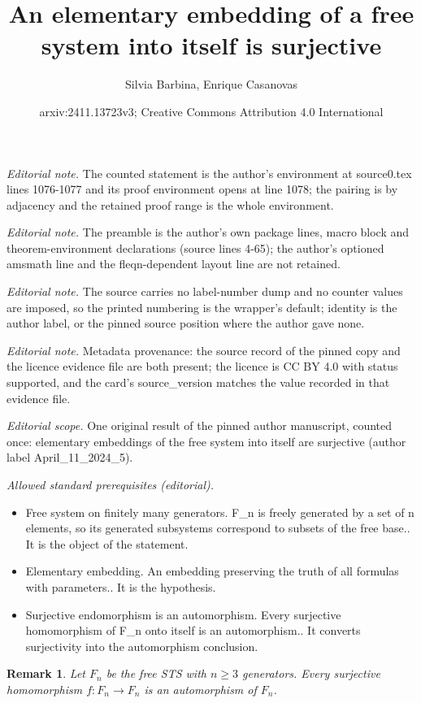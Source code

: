 \documentclass[10pt,a4paper]{article}
\title{An elementary embedding of a free system into itself is surjective}
\author{Silvia Barbina, Enrique Casanovas}
\date{arxiv:2411.13723v3; Creative Commons Attribution 4.0 International}
\theoremstyle{note}
\newtheorem{rmk}[thm]{Remark}
\begin{document}
\maketitle
\noindent\textit{Editorial note.} The counted statement is the author's environment at source0.tex lines 1076-1077 and its proof environment opens at line 1078; the pairing is by adjacency and the retained proof range is the whole environment.\par\medskip
\noindent\textit{Editorial note.} The preamble is the author's own package lines, macro block and theorem-environment declarations (source lines 4-65); the author's optioned amsmath line and the fleqn-dependent layout line are not retained.\par\medskip
\noindent\textit{Editorial note.} The source carries no label-number dump and no counter values are imposed, so the printed numbering is the wrapper's default; identity is the author label, or the pinned source position where the author gave none.\par\medskip
\noindent\textit{Editorial note.} Metadata provenance: the source record of the pinned copy and the licence evidence file are both present; the licence is CC BY 4.0 with status supported, and the card's source\_version matches the value recorded in that evidence file.\par\medskip
\noindent\textit{Editorial scope.} One original result of the pinned author manuscript, counted once: elementary embeddings of the free system into itself are surjective (author label April\_11\_2024\_5).\par\medskip
\noindent\textit{Allowed standard prerequisites (editorial).}\begin{itemize}
\item Free system on finitely many generators. F\_n is freely generated by a set of n elements, so its generated subsystems correspond to subsets of the free base.. It is the object of the statement.
\item Elementary embedding. An embedding preserving the truth of all formulas with parameters.. It is the hypothesis.
\item Surjective endomorphism is an automorphism. Every surjective homomorphism of F\_n onto itself is an automorphism.. It converts surjectivity into the automorphism conclusion.
\end{itemize}\medskip
	\begin{rmk}\label{April_11_2024_4} Let $F_n$ be the free STS with $n\geq 3$ generators. Every surjective homomorphism $f:F_n\rightarrow F_n$  is an automorphism of $F_n$.
	\end{rmk}
\end{document}

